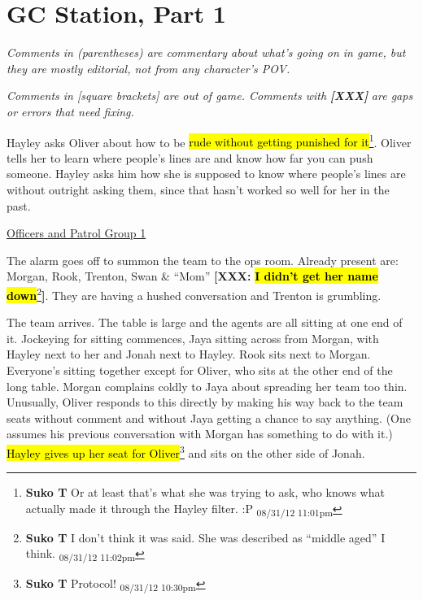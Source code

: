 \setcounter{chapter}{ 5 }
\chapter{GC Station, Part 1 }





\textit{Comments in (parentheses) are commentary about what's going on in game, but they are mostly editorial, not from any character's POV.}

\textit{Comments in {[}square brackets{]} are out of game.  Comments with}\textit{\textbf{ {[}XXX{]}}}\textit{ are gaps or errors that need fixing.}










Hayley asks Oliver about how to be \hl{rude without getting punished for it}\footnote{\textbf{Suko T }Or at least that's what she was trying to ask, who knows what actually made it through the Hayley filter. :P \textsubscript{08/31/12 11:01pm}}. Oliver tells her to learn where people's lines are and know how far you can push someone.  Hayley asks him how she is supposed to know where people's lines are without outright asking them, since that hasn't worked so well for her in the past.


\underline{ Officers and Patrol Group 1 }

The alarm goes off to summon the team to the ops room.  Already present are: Morgan, Rook, Trenton, Swan \& ``Mom''\textbf{ {[}XXX: }\textbf{\hl{I didn't get her name down}}\footnote{\textbf{Suko T }I don't think it was said. She was described as ``middle aged'' I think. \textsubscript{08/31/12 11:02pm}}\textbf{{]}}.\textbf{  }They are having a hushed conversation and Trenton is grumbling.



The team arrives.  The table is large and the agents are all sitting at one end of it.  Jockeying for sitting commences, Jaya sitting across from Morgan, with Hayley next to her and Jonah next to Hayley.  Rook sits next to Morgan.  Everyone's sitting together except for Oliver, who sits at the other end of the long table.  Morgan complains coldly to Jaya about spreading her team too thin.  Unusually, Oliver responds to this directly by making his way back to the team seats without comment and without Jaya getting a chance to say anything.  (One assumes his previous conversation with Morgan has something to do with it.)  \hl{Hayley gives up her seat for Oliver}\footnote{\textbf{Suko T }Protocol! \textsubscript{08/31/12 10:30pm}} and sits on the other side of Jonah.



